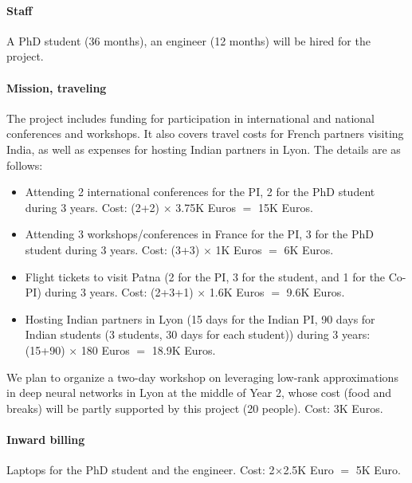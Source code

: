 \documentclass[a4paper,11pt]{article}
\begin{document}
\paragraph{Staff} A PhD student (36 months), an engineer (12 months) will be hired for the project. 

\paragraph{Mission, traveling} The project includes funding for participation in international and national conferences and workshops. It also covers travel costs for French partners visiting India, as well as expenses for hosting Indian partners in Lyon. The details are as follows:

\begin{itemize}
	\item Attending 2 international conferences for the PI, 2 for the PhD student during 3 years. Cost: (2+2) $\times $ 3.75K Euros $=$ 15K Euros.
	\item Attending 3 workshops/conferences in France for the PI, 3 for the PhD student during 3 years. Cost: (3+3) $\times$ 1K Euros $=$ 6K Euros.
	\item Flight tickets to visit Patna (2 for the PI, 3 for the student, and 1 for the Co-PI) during 3 years. Cost: (2+3+1) $\times$ 1.6K Euros $=$ 9.6K Euros.
	\item Hosting Indian partners in Lyon (15 days for the Indian PI, 90 days for Indian students (3 students, 30 days for each student)) during 3 years: (15+90) $\times$ 180 Euros $=$ 18.9K Euros.  
\end{itemize}
We plan to organize a two-day workshop on leveraging low-rank approximations in deep neural networks  in Lyon at the middle of Year 2, whose cost (food and breaks) will be partly supported by this project (20 people). Cost: 3K Euros.

\paragraph{Inward billing} Laptops for the PhD student and the engineer. Cost: 2$\times$2.5K Euro $=$ 5K Euro.
\end{document}
